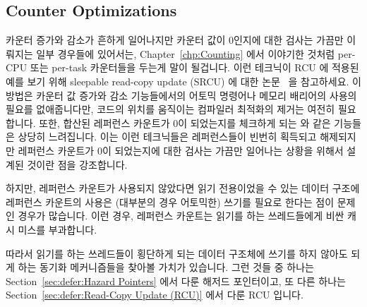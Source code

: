 \subsection{Counter Optimizations}
\label{sec:together:Counter Optimizations}

카운터 증가와 감소가 흔하게 일어나지만 카운터 값이 0인지에 대한 검사는 가끔만
이뤄지는 일부 경우들에 있어서는,
Chapter~\ref{chp:Counting} 에서 이야기한 것처럼 per-CPU 또는 per-task
카운터들을 두는게 말이 될겁니다.
이런 테크닉이 RCU 에 적용된 예를 보기 위해 sleepable read-copy update (SRCU) 에
대한 논문~\cite{PaulEMcKenney2006c} 을 참고하세요.
이 방법은 카운터 값 증가와 감소 기능들에서의 어토믹 명령어나 메모리 배리어의
사용의 필요를 없애줍니다만, 코드의 위치를 움직이는 컴파일러 최적화의 제거는
여전히 필요합니다.
또한, 합산된 레퍼런스 카운트가 0이 되었는지를 체크하게 되는
 와 같은 기능들은 상당히 느려집니다.
이는 이런 테크닉들은 레퍼런스들이 빈번히 획득되고 해제되지만 레퍼런스 카운트가
0이 되었는지에 대한 검사는 가끔만 일어나는 상황을 위해서 설계된 것이란 점을
강조합니다.
\iffalse

In some cases where increments and decrements are common, but checks
for zero are rare, it makes sense to maintain per-CPU or per-task
counters, as was discussed in Chapter~\ref{chp:Counting}.
See the paper on sleepable read-copy update
(SRCU) for an example of this technique applied to
RCU~\cite{PaulEMcKenney2006c}.
This approach eliminates the need for atomic instructions or memory
barriers on the increment and decrement primitives, but still requires
that code-motion compiler optimizations be disabled.
In addition, the primitives such as \co{synchronize_srcu()}
that check for the aggregate reference
count reaching zero can be quite slow.
This underscores the fact that these techniques are designed
for situations where the references are frequently acquired and
released, but where it is rarely necessary to check for a zero
reference count.
\fi


하지만, 레퍼런스 카운트가 사용되지 않았다면 읽기 전용이었을 수 있는 데이터
구조에 레퍼런스 카운트의 사용은 (대부분의 경우 어토믹한) 쓰기를 필요로 한다는
점이 문제인 경우가 많습니다.
이런 경우, 레퍼런스 카운트는 읽기를 하는 쓰레드들에게 비싼 캐시 미스를
부과합니다.

따라서 읽기를 하는 쓰레드들이 횡단하게 되는 데이터 구조체에 쓰기를 하지 않아도
되게 하는 동기화 메커니즘들을 찾아볼 가치가 있습니다.
그런 것들 중 하나는
Section~\ref{sec:defer:Hazard Pointers} 에서 다룬 해저드 포인터이고, 또 다른
하나는
Section~\ref{sec:defer:Read-Copy Update (RCU)} 에서 다룬 RCU 입니다.
\iffalse

However, it is usually the case that use of reference counts requires
writing (often atomically) to a data structure that is otherwise
read only.
In this case, reference counts are imposing expensive cache misses
on readers.

It is therefore worthwhile to look into synchronization mechanisms
that do not require readers to write to the data structure being
traversed.
One possibility is the hazard pointers covered in
Section~\ref{sec:defer:Hazard Pointers}
and another is RCU, which is covered in
Section~\ref{sec:defer:Read-Copy Update (RCU)}.
\fi
